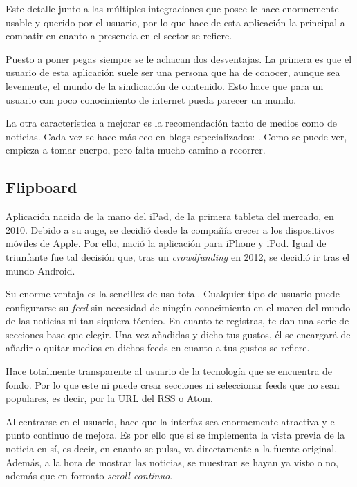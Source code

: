Este detalle junto a las múltiples integraciones que posee le hace enormemente usable y querido por el usuario, por lo que hace de esta aplicación la principal a combatir en cuanto a presencia en el sector se refiere.

Puesto a poner pegas siempre se le achacan dos desventajas. La primera es que el usuario de esta aplicación suele ser una persona que ha de conocer, aunque sea levemente, el mundo de la sindicación de contenido. Esto hace que para un usuario con poco conocimiento de internet pueda parecer un mundo.

La otra característica a mejorar es la recomendación tanto de medios como de noticias. Cada vez se hace más eco en blogs especializados: . Como se puede ver, empieza a tomar cuerpo, pero falta mucho camino a recorrer.


\subsection{Flipboard}

Aplicación nacida de la mano del iPad, de la primera tableta del mercado, en 2010. Debido a su auge, se decidió desde la compañía crecer a los dispositivos móviles de Apple. Por ello, nació la aplicación para iPhone y iPod. Igual de triunfante fue tal decisión que, tras un \textit{crowdfunding} en 2012, se decidió ir tras el mundo Android.


Su enorme ventaja es la sencillez de uso total. Cualquier tipo de usuario puede configurarse su \textit{feed} sin necesidad de ningún conocimiento en el marco del mundo de las noticias ni tan siquiera técnico. En cuanto te registras, te dan una serie de secciones base que elegir. Una vez añadidas y dicho tus gustos, él se encargará de añadir o quitar medios en dichos feeds en cuanto a tus gustos se refiere.

Hace totalmente transparente al usuario de la tecnología que se encuentra de fondo. Por lo que este ni puede crear secciones ni seleccionar feeds que no sean populares, es decir, por la URL del RSS o Atom.

Al centrarse en el usuario, hace que la interfaz sea enormemente atractiva y el punto continuo de mejora. Es por ello que si se implementa la vista previa de la noticia en sí, es decir, en cuanto se pulsa, va directamente a la fuente original. Además, a la hora de mostrar las noticias, se muestran se hayan ya visto o no, además que en formato \textit{scroll continuo}.


